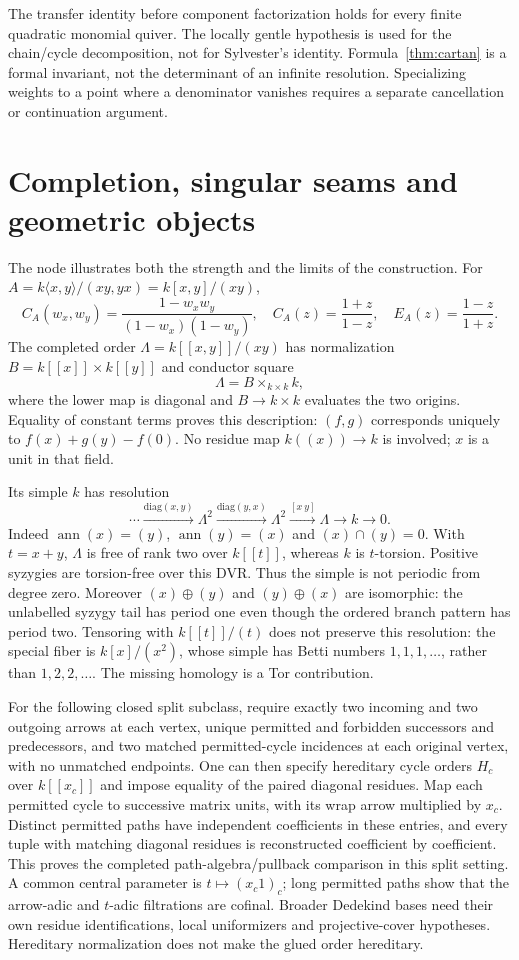 The transfer identity before component factorization holds for every finite quadratic monomial quiver. The locally gentle hypothesis is used for the chain/cycle decomposition, not for Sylvester's identity. Formula~\ref{thm:cartan} is a formal invariant, not the determinant of an infinite resolution. Specializing weights to a point where a denominator vanishes requires a separate cancellation or continuation argument.

\section{Completion, singular seams and geometric objects}
The node illustrates both the strength and the limits of the construction. For $A=k\langle x,y\rangle/(xy,yx)=k[x,y]/(xy)$,
\[
 C_A(w_x,w_y)=\frac{1-w_xw_y}{(1-w_x)(1-w_y)},\quad
 C_A(z)=\frac{1+z}{1-z},\quad E_A(z)=\frac{1-z}{1+z}.
\]
The completed order $\Lambda=k[[x,y]]/(xy)$ has normalization
$B=k[[x]]\times k[[y]]$ and conductor square
\[
 \Lambda=B\times_{k\times k}k,
\]
where the lower map is diagonal and $B\to k\times k$ evaluates the two origins. Equality of constant terms proves this description: $(f,g)$ corresponds uniquely to $f(x)+g(y)-f(0)$. No residue map $k((x))\to k$ is involved; $x$ is a unit in that field.

Its simple $k$ has resolution
\[
 \cdots\xrightarrow{\mathrm{diag}(x,y)}\Lambda^2
 \xrightarrow{\mathrm{diag}(y,x)}\Lambda^2
 \xrightarrow{[x\ y]}\Lambda\longrightarrow k\longrightarrow0.
\]
Indeed $\operatorname{ann}(x)=(y)$, $\operatorname{ann}(y)=(x)$ and $(x)\cap(y)=0$. With $t=x+y$, $\Lambda$ is free of rank two over $k[[t]]$, whereas $k$ is $t$-torsion. Positive syzygies are torsion-free over this DVR. Thus the simple is not periodic from degree zero. Moreover $(x)\oplus(y)$ and $(y)\oplus(x)$ are isomorphic: the unlabelled syzygy tail has period one even though the ordered branch pattern has period two. Tensoring with $k[[t]]/(t)$ does not preserve this resolution: the special fiber is $k[x]/(x^2)$, whose simple has Betti numbers $1,1,1,\ldots$, rather than $1,2,2,\ldots$. The missing homology is a Tor contribution.

For the following closed split subclass, require exactly two incoming and two outgoing arrows at each vertex, unique permitted and forbidden successors and predecessors, and two matched permitted-cycle incidences at each original vertex, with no unmatched endpoints. One can then specify hereditary cycle orders $H_c$ over $k[[x_c]]$ and impose equality of the paired diagonal residues. Map each permitted cycle to successive matrix units, with its wrap arrow multiplied by $x_c$. Distinct permitted paths have independent coefficients in these entries, and every tuple with matching diagonal residues is reconstructed coefficient by coefficient. This proves the completed path-algebra/pullback comparison in this split setting. A common central parameter is $t\mapsto(x_c1)_c$; long permitted paths show that the arrow-adic and $t$-adic filtrations are cofinal. Broader Dedekind bases need their own residue identifications, local uniformizers and projective-cover hypotheses. Hereditary normalization does not make the glued order hereditary.

